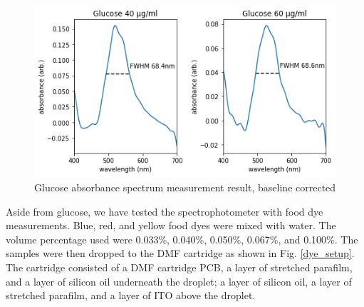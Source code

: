 \documentclass[conference]{IEEEtran}
\begin{document}
\begin{figure}[htbp]
    \centerline{\includegraphics[scale=0.5]{glucose-res.png}}
    \caption{Glucose absorbance spectrum measurement result, baseline corrected}
    \label{glucose_result}
    \end{figure}

Aside from glucose, we have tested the spectrophotometer with food dye measurements.
Blue, red, and yellow food dyes were mixed with water.
The volume percentage used were 0.033\%, 0.040\%, 0.050\%, 0.067\%, and 0.100\%.
The samples were then dropped to the DMF cartridge as shown in Fig. \ref{dye_setup}.
The cartridge consisted of a DMF cartridge PCB, a layer of stretched parafilm, and a layer of silicon oil underneath the droplet;
a layer of silicon oil, a layer of stretched parafilm, and a layer of ITO above the droplet. 
\end{document}
